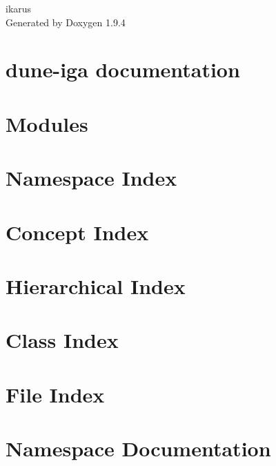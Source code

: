 \documentclass[twoside]{book}
\newcommand{\+}{\discretionary{\mbox{\scriptsize$\hookleftarrow$}}{}{}}
\newcommand{\clearemptydoublepage}{%
    \newpage{\pagestyle{empty}\cleardoublepage}%
  }
\begin{document}
  \raggedbottom
    \hypersetup{pageanchor=false,
                bookmarksnumbered=true,
                pdfencoding=unicode
               }
  \begin{titlepage}
  \vspace*{7cm}
  \begin{center}%
  {\Large ikarus}\\
  \vspace*{1cm}
  {\large Generated by Doxygen 1.9.4}\\
  \end{center}
  \end{titlepage}
  \clearemptydoublepage
  \tableofcontents
  \clearemptydoublepage
  \hypersetup{pageanchor=true}
\chapter{dune-\/iga documentation}
\label{index}\hypertarget{index}{}
\chapter{Modules}
\label{a02436}

\chapter{Namespace Index}

\chapter{Concept Index}

\chapter{Hierarchical Index}

\chapter{Class Index}

\chapter{File Index}

\chapter{Namespace Documentation}




















\end{document}
